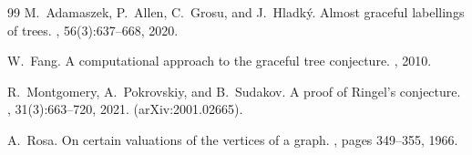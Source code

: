 \documentclass[11pt,a4paper]{article}
\begin{document}

\begin{thebibliography}{99}
M.~Adamaszek, P.~Allen, C.~Grosu, and J.~Hladk\'y.
\newblock Almost graceful labellings of trees.
, 56(3):637--668, 2020.

W.~Fang.
\newblock A computational approach to the graceful tree conjecture.
, 2010.

R.~Montgomery, A.~Pokrovskiy, and B.~Sudakov.
\newblock A proof of {R}ingel's conjecture.
, 31(3):663--720, 2021.
\newblock (arXiv:2001.02665).

A.~Rosa.
\newblock On certain valuations of the vertices of a graph.
, pages 349--355, 1966.
\end{thebibliography}
\end{document}
